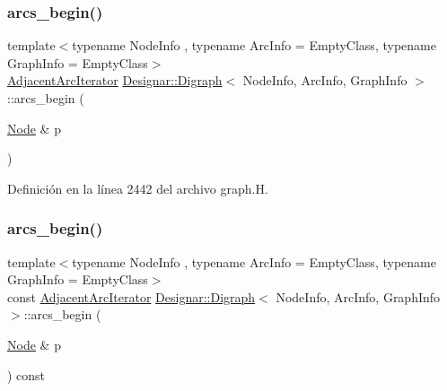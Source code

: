 \subsubsection{\texorpdfstring{arcs\+\_\+begin()}{arcs\_begin()}\hspace{0.1cm}{\footnotesize\ttfamily [3/4]}}
{\footnotesize\ttfamily template$<$typename Node\+Info , typename Arc\+Info  = Empty\+Class, typename Graph\+Info  = Empty\+Class$>$ \\
\hyperlink{class_designar_1_1_digraph_1_1_adjacent_arc_iterator}{Adjacent\+Arc\+Iterator} \hyperlink{class_designar_1_1_digraph}{Designar\+::\+Digraph}$<$ Node\+Info, Arc\+Info, Graph\+Info $>$\+::arcs\+\_\+begin (\begin{DoxyParamCaption}\item[{\hyperlink{class_designar_1_1_digraph_a4dc921c41a480b7946a04170e997d8ae}{Node} \&}]{p }\end{DoxyParamCaption})\hspace{0.3cm}{\ttfamily [inline]}}



Definición en la línea 2442 del archivo graph.\+H.

\mbox{\label{class_designar_1_1_digraph_aa17a29b3ea956a3ad98e991fb13d0a20}} 
\subsubsection{\texorpdfstring{arcs\+\_\+begin()}{arcs\_begin()}\hspace{0.1cm}{\footnotesize\ttfamily [4/4]}}
{\footnotesize\ttfamily template$<$typename Node\+Info , typename Arc\+Info  = Empty\+Class, typename Graph\+Info  = Empty\+Class$>$ \\
const \hyperlink{class_designar_1_1_digraph_1_1_adjacent_arc_iterator}{Adjacent\+Arc\+Iterator} \hyperlink{class_designar_1_1_digraph}{Designar\+::\+Digraph}$<$ Node\+Info, Arc\+Info, Graph\+Info $>$\+::arcs\+\_\+begin (\begin{DoxyParamCaption}\item[{\hyperlink{class_designar_1_1_digraph_a4dc921c41a480b7946a04170e997d8ae}{Node} \&}]{p }\end{DoxyParamCaption}) const\hspace{0.3cm}{\ttfamily [inline]}}



